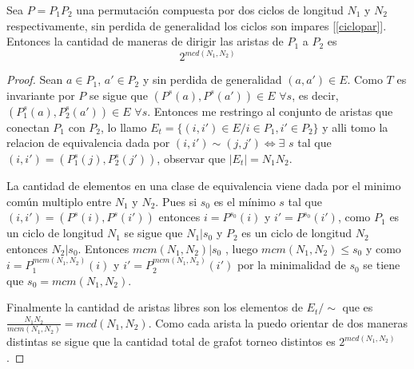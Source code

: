 	\begin{lema}\label{aristaciclos}
	Sea $P=P_1P_2$ una permutaci\'on compuesta por dos ciclos de longitud
$N_1$ y $N_2$ respectivamente, sin perdida de generalidad los ciclos son 
impares [\ref{ciclopar}]. Entonces la cantidad de maneras de dirigir las 
aristas de $P_1$ a $P_2$ es 
	\begin{equation}2^{mcd(N_1,N_2)}\end{equation}
	\end{lema}
	\begin{proof}
		Sean $a \in P_1$, $a' \in P_2$ y sin perdida de generalidad 
$(a,a')\in E$. Como $T$ es invariante por $P$ se sigue que $(P^s(a),P^s(a')) \in E$
$\forall s$, es decir, $(P_1^s(a),P_2^s(a'))\in E$ $\forall s$. Entonces
me restringo al conjunto de aristas que conectan $P_1$ con $P_2$, lo llamo
$E_t=\{ (i,i')\in E / i\in P_1, i'\in P_2 \}$ y alli tomo la
relacion de equivalencia dada por $(i,i')\sim(j,j') \iff \exists$ $s$ tal que
$(i,i')=(P_1^s(j),P_2^s(j'))$, observar que $|E_t|=N_1N_2$. 


		La cantidad de elementos en una clase de equivalencia viene dada por el 
minimo com\'un multiplo entre $N_1$ y $N_2$. Pues si $s_0$ es el m\'inimo 
$s$ tal que $(i,i')=(P^s(i),P^s(i'))$ entonces $i=P^{s_0}(i)$ y $i'=P^{s_0}(i')$, 
como $P_1$ es un ciclo de longitud $N_1$ se sigue que $N_1|s_0$ y 
$P_2$ es un ciclo de longitud $N_2$ entonces $N_2|s_0$. Entonces $mcm(N_1,N_2)|s_0$
, luego $mcm(N_1,N_2)\leq s_0$ y como $i=P_1^{mcm(N_1,N_2)}(i)$ y $i'=P_2^{mcm(N_1,N_2)}(i')$
por la minimalidad de $s_0$ se tiene que $s_0=mcm(N_1,N_2)$.


		Finalmente la cantidad de aristas libres son los elementos de 
$E_t/\sim$ que es $\frac{N_1N_2}{mcm(N_1,N_2)}=mcd(N_1,N_2)$. Como cada
arista la puedo orientar de dos maneras distintas se sigue que la cantidad
total de grafot torneo distintos es $2^{mcd(N_1,N_2)}$.
	\end{proof}
	
